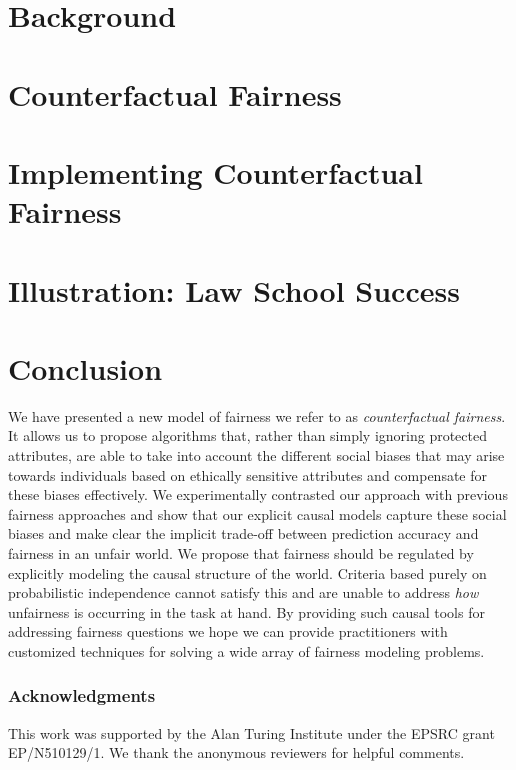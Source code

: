 \documentclass{article}
\begin{document}
\section{Background}
\label{sec:background}


%

%

\section{Counterfactual Fairness}
\label{sec:count_fair}


\section{Implementing Counterfactual Fairness}
\label{sec:methods}


\section{Illustration: Law School Success}
\label{sec:experiments}


\section{Conclusion}
\label{sec:conclusion}
We have presented a new model of fairness we refer to as {\em
  counterfactual fairness}. It allows us to propose algorithms
that, rather than simply ignoring protected attributes, are able to
take into account the different social biases that may arise towards
individuals based on ethically sensitive attributes
and compensate
for these biases effectively. We experimentally contrasted our
approach with previous fairness approaches and show that our explicit
causal models capture these social biases and make clear the implicit
trade-off between prediction accuracy and fairness in an unfair
world. We propose that fairness should be regulated by explicitly
modeling the causal structure of the world. Criteria based purely on
probabilistic independence cannot satisfy this and are unable to
address \emph{how} unfairness is occurring in the task at hand. By
providing such causal tools for addressing fairness questions we hope
we can provide practitioners with customized techniques for solving a
wide array of fairness modeling problems.

\subsubsection*{Acknowledgments}

This work was supported by the Alan Turing Institute under the EPSRC
grant EP/N510129/1. We thank the anonymous reviewers for helpful
comments.




\newpage

\end{document}

